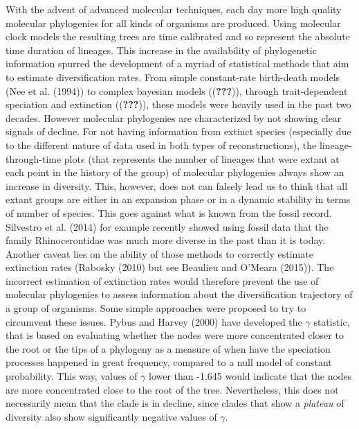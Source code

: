 \documentclass[11pt,]{article}
\begin{document}
With the advent of advanced molecular techniques, each day more high
quality molecular phylogenies for all kinds of organisms are produced.
Using molecular clock models the resulting trees are time calibrated and
so represent the absolute time duration of lineages. This increase in
the availability of phylogenetic information spurred the development of
a myriad of statistical methods that aim to estimate diversification
rates. From simple constant-rate birth-death models (Nee et al. (1994))
to complex bayesian models (({\textbf{???}})), through trait-dependent
speciation and extinction (({\textbf{???}})), these models were heavily
used in the past two decades. However molecular phylogenies are
characterized by not showing clear signals of decline. For not having
information from extinct species (especially due to the different nature
of data used in both types of reconstructions), the lineage-through-time
plots (that represents the number of lineages that were extant at each
point in the history of the group) of molecular phylogenies always show
an increase in diversity. This, however, does not can falsely lead us to
think that all extant groups are either in an expansion phase or in a
dynamic stability in terms of number of species. This goes against what
is known from the fossil record. Silvestro et al. (2014) for example
recently showed using fossil data that the family Rhinocerontidae was
much more diverse in the past than it is today. Another caveat lies on
the ability of those methods to correctly estimate extinction rates
(Rabosky (2010) but see Beaulieu and O'Meara (2015)). The incorrect
estimation of extinction rates would therefore prevent the use of
molecular phylogenies to assess information about the diversification
trajectory of a group of organisms. Some simple approaches were proposed
to try to circumvent these issues. Pybus and Harvey (2000) have
developed the \(\gamma\) statistic, that is based on evaluating whether
the nodes were more concentrated closer to the root or the tips of a
phylogeny as a measure of when have the speciation processes happened in
great frequency, compared to a null model of constant probability. This
way, values of \(\gamma\) lower than -1.645 would indicate that the
nodes are more concentrated close to the root of the tree. Nevertheless,
this does not necessarily mean that the clade is in decline, since
clades that show a \emph{plateau} of diversity also show significantly
negative values of \(\gamma\).
\end{document}

